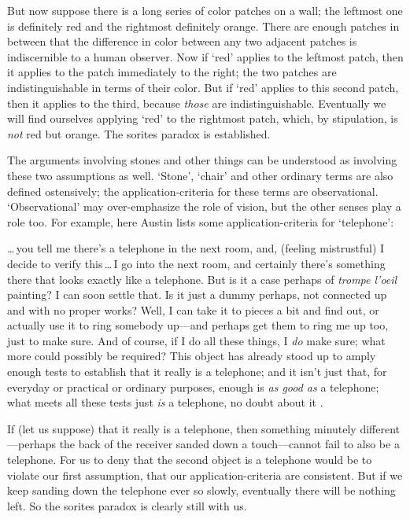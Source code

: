 \documentclass[11pt]{standalone}
\newenvironment{squote}{%
\begin{spacing}{1}
       	\begin{list}{}{%
\setlength{\labelwidth}{0pt}%
\rightmargin\leftmargin%
}
\item\relax
}{%
\end{list}%
\end{spacing}
}
\begin{document}
\begin{spacing}{1.5}
But now suppose there is a long series of color patches on a wall; the
leftmost one is definitely red and the rightmost definitely orange.
There are enough patches in between that the difference in color
between any two adjacent patches is indiscernible to a human observer.
Now if `red' applies to the leftmost patch, then it applies to the
patch immediately to the right; the two patches are indistinguishable
in terms of their color.  But if `red' applies to this second patch,
then it applies to the third, because \emph{those} are
indistinguishable.  Eventually we will find ourselves applying `red'
to the rightmost patch, which, by stipulation, is \emph{not} red but
orange.  The sorites paradox is established.

The arguments involving stones and other things can be understood as
involving these two assumptions as well.  `Stone', `chair' and other
ordinary terms are also defined ostensively; the application-criteria
for these terms are observational.  `Observational' may over-emphasize
the role of vision, but the other senses play a role too.  For
example, here Austin lists some application-criteria for `telephone':

\begin{squote}
\ldots\,you tell me there's a telephone in the next room, and,
(feeling mistrustful) I decide to verify this\,\ldots\,I go into the
next room, and certainly there's something there that looks exactly
like a telephone.  But is it a case perhaps of \emph{trompe l'oeil}
painting?  I can soon settle that.  Is it just a dummy perhaps, not
connected up and with no proper works?  Well, I can take it to pieces
a bit and find out, or actually use it to ring somebody up---and
perhaps get them to ring me up too, just to make sure.  And of course,
if I do all these things, I \emph{do} make sure; what more could
possibly be required?  This object has already stood up to amply
enough tests to establish that it really is a telephone; and it isn't
just that, for everyday or practical or ordinary purposes, enough is
\emph{as good as} a telephone; what meets all these tests just
\emph{is} a telephone, no doubt about it \citep[118--119]{austin1964}.
\end{squote}

If (let us suppose) that it really is a telephone, then something
minutely different---perhaps the back of the receiver sanded down a
touch---cannot fail to also be a telephone.  For us to deny that the
second object is a telephone would be to violate our first assumption,
that our application-criteria are consistent.  But if we keep sanding
down the telephone ever so slowly, eventually there will be nothing
left.  So the sorites paradox is clearly still with us.


\end{spacing}
\end{document}
